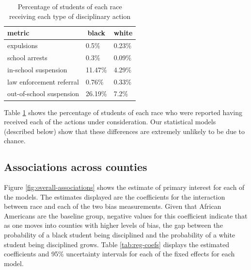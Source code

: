 \documentclass[english,floatsintext,man]{apa6}
\theoremstyle{definition}
\theoremstyle{definition}
\theoremstyle{remark}
\begin{document}
\begin{table}[tbp]
\begin{center}
\begin{threeparttable}
\caption{\label{tab:disc-count}Percentage of students of each race receiving each type of disciplinary action}
\begin{tabular}{lll}
\toprule
metric & \multicolumn{1}{c}{black} & \multicolumn{1}{c}{white}\\
\midrule
expulsions & 0.5\% & 0.23\%\\
school arrests & 0.3\% & 0.09\%\\
in-school suspension & 11.47\% & 4.29\%\\
law enforcement referral & 0.76\% & 0.33\%\\
out-of-school suspension & 26.19\% & 7.2\%\\
\bottomrule
\end{tabular}
\end{threeparttable}
\end{center}
\end{table}

Table \ref{tab:disc-count} shows the percentage of students of each race
who were reported having received each of the actions under
consideration. Our statistical models (described below) show that these
differences are extremely unlikely to be due to chance.

\subsection{Associations across
counties}\label{associations-across-counties}

Figure \ref{fig:overall-associations} shows the estimate of primary
interest for each of the models. The estimates displayed are the
coefficients for the interaction between race and each of the two bias
measurements. Given that African Americans are the baseline group,
negative values for this coefficient indicate that as one moves into
counties with higher levels of bias, the gap between the probability of
a black student being disciplined and the probability of a white student
being disciplined grows. Table \ref{tab:reg-coefs} displays the
estimated coefficients and 95\% uncertainty intervals for each of the
fixed effects for each model.
\end{document}
